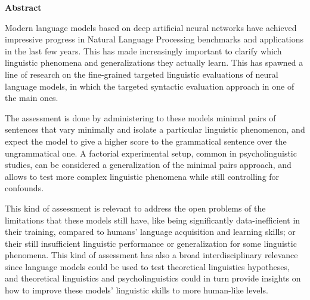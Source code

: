 \thispagestyle{plain}
\begin{center}
	\Large
	\vspace{1.8cm}
    \textbf{Abstract}
    	\vspace{0.9cm}
\end{center}

\normalsize
Modern language models based on deep artificial neural networks have achieved impressive progress in Natural Language Processing benchmarks and applications in the last few years. This has made increasingly important to clarify which linguistic phenomena and generalizations they actually learn. This has spawned a line of research on the fine-grained targeted linguistic evaluations of neural language models, in which the targeted syntactic evaluation approach in one of the main ones.

The assessment is done by administering to these models minimal pairs of sentences that vary minimally and isolate a particular linguistic phenomenon, and expect the model to give a higher score to the grammatical sentence over the ungrammatical one. A factorial experimental setup, common in psycholinguistic studies, can be considered a generalization of the minimal pairs approach, and allows to test more complex linguistic phenomena while still controlling for confounds.



This kind of assessment is relevant to address the open problems of the limitations that these models still have, like being significantly data-inefficient in their training, compared to humans’ language acquisition and learning skills; or their still insufficient linguistic performance or generalization for some linguistic phenomena. This kind of assessment has also a broad interdisciplinary relevance since language models could be used to test theoretical linguistics hypotheses, and theoretical linguistics and psycholinguistics could in turn provide insights on how to improve these models' linguistic skills to more human-like levels.\\ 

